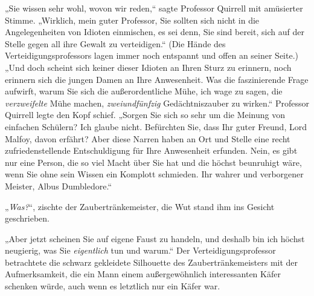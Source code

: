 „Sie wissen sehr wohl, wovon wir reden,“ sagte Professor Quirrell mit amüsierter Stimme. „Wirklich, mein guter Professor, Sie sollten sich nicht in die Angelegenheiten von Idioten einmischen, es sei denn, Sie sind bereit, sich auf der Stelle gegen all ihre Gewalt zu verteidigen.“ (Die Hände des Verteidigungsprofessors lagen immer noch entspannt und offen an seiner Seite.) „Und doch scheint sich keiner dieser Idioten an Ihren Sturz zu erinnern, noch erinnern sich die jungen Damen an Ihre Anwesenheit. Was die faszinierende Frage aufwirft, warum Sie sich die außerordentliche Mühe, ich wage zu sagen, die \emph{verzweifelte} Mühe machen, \emph{zweiundfünfzig} Gedächtniszauber zu wirken.“ Professor Quirrell legte den Kopf schief. „Sorgen Sie sich so sehr um die Meinung von einfachen Schülern? Ich glaube nicht. Befürchten Sie, dass Ihr guter Freund, Lord Malfoy, davon erfährt? Aber diese Narren haben an Ort und Stelle eine recht zufriedenstellende Entschuldigung für Ihre Anwesenheit erfunden. Nein, es gibt nur eine Person, die so viel Macht über Sie hat und die höchst beunruhigt wäre, wenn Sie ohne sein Wissen ein Komplott schmieden. Ihr wahrer und verborgener Meister, Albus Dumbledore.“

„\emph{Was?}“, zischte der Zaubertränkemeister, die Wut stand ihm ins Gesicht geschrieben.

„Aber jetzt scheinen Sie auf eigene Faust zu handeln, und deshalb bin ich höchst neugierig, was Sie \emph{eigentlich} tun und warum.“ Der Verteidigungsprofessor betrachtete die schwarz gekleidete Silhouette des Zaubertränkemeisters mit der Aufmerksamkeit, die ein Mann einem außergewöhnlich interessanten Käfer schenken würde, auch wenn es letztlich nur ein Käfer war.

